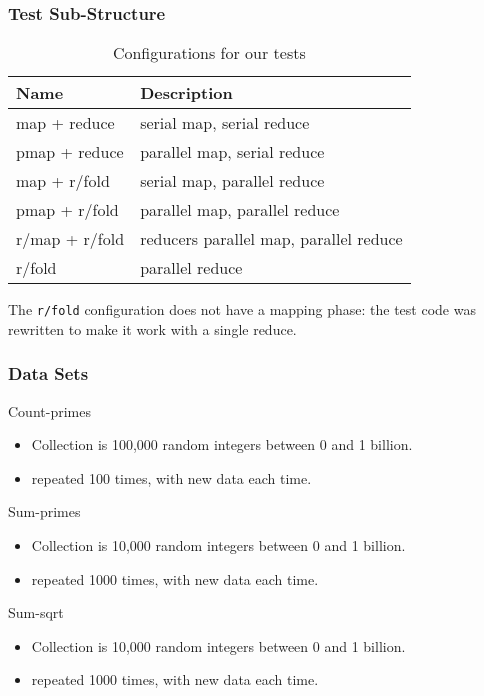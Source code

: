 \documentclass{beamer}
\newcommand{\clocode}[1]{{\texttt {#1}}}
\begin{document}
\begin{frame}
\frametitle{Test Sub-Structure}
\begin{table}
\begin{center}
\begin{tabular}{|l|l|}
\hline 
Name & Description \\
\hline
map + reduce & serial map, serial reduce \\
pmap + reduce & parallel map, serial reduce \\
map + r/fold & serial map, parallel reduce \\
pmap + r/fold & parallel map, parallel reduce\\
r/map + r/fold & reducers parallel map, parallel reduce\\
r/fold & parallel reduce\\
\hline
\end{tabular}
\end{center}
\caption{Configurations for our tests}\label{table:tests}
\end{table}
The \clocode{r/fold} configuration does not have a mapping phase: the test code was rewritten to make it work with a single reduce.
\end{frame}

\begin{frame}
\frametitle{Data Sets}
Count-primes
	\begin{itemize}
	\item Collection is 100,000 random integers between 0 and 1 billion.
	\item repeated 100 times, with new data each time. 
	\end{itemize}
Sum-primes
	\begin{itemize}
	\item Collection is 10,000 random integers  between 0 and 1 billion.
	\item repeated 1000 times, with new data each time. 
	\end{itemize}
Sum-sqrt
	\begin{itemize}
	\item Collection is 10,000 random integers  between 0 and 1 billion.
	\item repeated 1000 times, with new data each time. 
	\end{itemize}
\end{frame}
\end{document}
